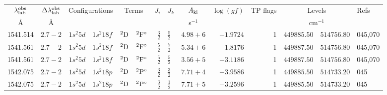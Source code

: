 



\begin{table}
\begin{tabular}{rrr@{ -- }lr@{ -- }lr@{ -- }llrrr@{ -- }rl}
\hline
\multicolumn{1}{c}{$\lambda_{\rm lab}^{\rm obs}$\phantom{0000}} & \multicolumn{1}{c}{$\Delta\lambda_{\rm lab}^{\rm obs}$} & \multicolumn{2}{c}{Configurations} & \multicolumn{2}{c}{Terms} & $J_i$ & $J_k$ & \multicolumn{1}{c}{$A_{\rm ki}$} & \multicolumn{1}{c}{$\log(gf)$} & TP flags & \multicolumn{2}{c}{Levels} & Refs \\
\multicolumn{1}{c}{\AA\phantom{0000}} & \multicolumn{1}{c}{\AA} & \multicolumn{2}{c}{} & \multicolumn{2}{c}{} & \multicolumn{2}{c}{} & \multicolumn{1}{c}{s$^{-1}$} & & & \multicolumn{2}{c}{cm$^{-1}$} & \\
\hline
   1541.514\phantom{0000000} & $2.7-2$ &  $1s^{2}5d$ & $1s^{2}18f$ &       $^{2}{\rm D}$ & $^{2}{\rm F}^\circ$ &  $\frac{3}{2}$ & $\frac{5}{2}$  & $4.98+6$ & $ -1.9724$ &     1 & $449885.50$ & $514756.80$ & 045,070 \\
   1541.561\phantom{0000000} & $2.7-2$ &  $1s^{2}5d$ & $1s^{2}18f$ &       $^{2}{\rm D}$ & $^{2}{\rm F}^\circ$ &  $\frac{5}{2}$ & $\frac{7}{2}$  & $5.34+6$ & $ -1.8176$ &     1 & $449887.50$ & $514756.80$ & 045,070 \\
   1541.561\phantom{0000000} & $2.7-2$ &  $1s^{2}5d$ & $1s^{2}18f$ &       $^{2}{\rm D}$ & $^{2}{\rm F}^\circ$ &  $\frac{5}{2}$ & $\frac{5}{2}$  & $3.56+5$ & $ -3.1186$ &     1 & $449887.50$ & $514756.80$ & 045,070 \\
   1542.075\phantom{0000000} & $2.7-2$ &  $1s^{2}5d$ & $1s^{2}18p$ &       $^{2}{\rm D}$ & $^{2}{\rm P}^\circ$ &  $\frac{3}{2}$ & $\frac{3}{2}$  & $7.71+4$ & $ -3.9586$ &     1 & $449885.50$ & $514733.20$ & 045 \\
   1542.075\phantom{0000000} & $2.7-2$ &  $1s^{2}5d$ & $1s^{2}18p$ &       $^{2}{\rm D}$ & $^{2}{\rm P}^\circ$ &  $\frac{3}{2}$ & $\frac{1}{2}$  & $7.71+5$ & $ -3.2596$ &     1 & $449885.50$ & $514733.20$ & 045 \\

\end{tabular}
\end{table}
